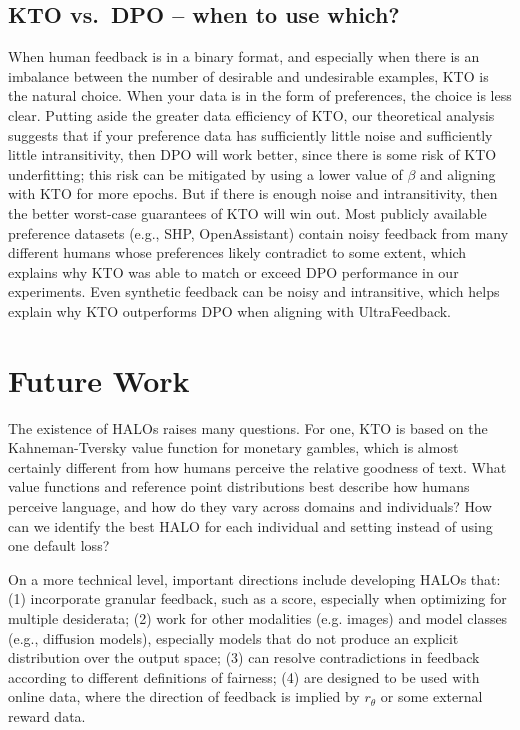\subsection{KTO vs.\ DPO -- when to use which? }
When human feedback is in a binary format, and especially when there is an imbalance between the number of desirable and undesirable examples, KTO is the natural choice.
When your data is in the form of preferences, the choice is less clear.
Putting aside the greater data efficiency of KTO, our theoretical analysis suggests that if your preference data has sufficiently little noise and sufficiently little intransitivity, then DPO will work better, since there is some risk of KTO underfitting; this risk can be mitigated by using a lower value of $\beta$ and aligning with KTO for more epochs.
But if there is enough noise and intransitivity, then the better worst-case guarantees of KTO will win out.
Most publicly available preference datasets (e.g., SHP, OpenAssistant) contain noisy feedback from many different humans whose preferences likely contradict to some extent, which explains why KTO was able to match or exceed DPO performance in our experiments.
Even synthetic feedback can be noisy and intransitive, which helps explain why KTO outperforms DPO when aligning with UltraFeedback. 

\section{Future Work}

The existence of HALOs raises many questions. For one, KTO is based on the Kahneman-Tversky value function for monetary gambles, which is almost certainly different from how humans perceive the relative goodness of text. 
What value functions and reference point distributions best describe how humans perceive language, and how do they vary across domains and individuals?
How can we identify the best HALO for each individual and setting instead of using one default loss?

On a more technical level, important directions include developing HALOs that: (1) incorporate granular feedback, such as a score, especially when optimizing for multiple desiderata; (2) work for other modalities (e.g. images) and model classes (e.g., diffusion models), especially models that do not produce an explicit distribution over the output space; (3) can resolve contradictions in feedback according to different definitions of fairness; (4) are designed to be used with online data, where the direction of feedback is implied by $r_\theta$ or some external reward data.

